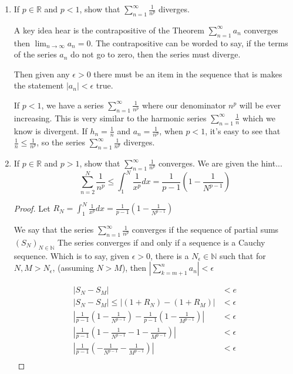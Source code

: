 \documentclass{tufte-book}
\theoremstyle{mytheoremstyle}
\theoremstyle{mylemstyle}
\theoremstyle{mydefstyle}
\begin{document}
\begin{enumerate}

\item If $p \in \mathbb{R}$ and $p < 1$, show that $\sum_{n=1}^{\infty}\frac{1}{n^p}$ diverges.

A key idea hear is the contrapositive of the Theorem $\sum_{n=1}^{\infty}a_n$ converges then $\lim_{n \rightarrow \infty}a_n = 0$. The contrapositive can be worded to say, if the terms of the series $a_n$ do not go to zero, then the series must diverge.

Then given any $\epsilon > 0$ there must be an item in the sequence that is makes the statement $|a_n| < \epsilon$ true.  

If  $p < 1$, we have a series $\sum_{n=1}^{\infty}\frac{1}{n^p}$ where our denominator $n^p$ will be ever increasing.  This is very similar to the harmonic series $\sum_{n=1}^{\infty}\frac{1}{n}$ which we know is divergent.  If $h_n = \frac{1}{n}$ and $a_n = \frac{1}{n^p}$, when $p < 1$, it's easy to see that
$\frac{1}{n} \leq \frac{1}{n^p}$, so the series $\sum_{n=1}^{\infty}\frac{1}{n^p}$ diverges.


\item If $p \in \mathbb{R}$ and $p > 1$, show that $\sum_{n=1}^{\infty}\frac{1}{n^p}$ converges.
We are given the hint...
\[ \sum_{n=2}^{N}\frac{1}{n^p} \leq \int_{1}^{N} \frac{1}{x^p}dx = \frac{1}{p-1}(1-\frac{1}{N^{p-1}})\]


\begin{proof}


Let $R_N = \int_{1}^{N} \frac{1}{x^p}dx = \frac{1}{p-1}(1-\frac{1}{N^{p-1}})$

We  say that the series $\sum_{n=1}^{\infty}\frac{1}{n^p}$ converges if the sequence of partial sums $(S_N)_{N \in \mathbb{N}}$  The series converges if and only if a sequence is a Cauchy sequence.  Which is to say, given $\epsilon > 0$, there is a $N_\epsilon\in \mathbb{N}$ such that for $N,M > N_\epsilon$, (assuming $N>M$), then $|\sum_{k=m+1}^{n}a_n| < \epsilon$

\begin{align*}
|S_N - S_M| &< e \\
|S_N - S_M| \leq |(1 + R_N) - (1 + R_M)| &< \epsilon \\
|\frac{1}{p-1}(1-\frac{1}{N^{p-1}}) - \frac{1}{p-1}(1-\frac{1}{M^{p-1}})| &< \epsilon \\
|\frac{1}{p-1}(1-\frac{1}{N^{p-1}} - 1-\frac{1}{M^{p-1}})| &< \epsilon\\
|\frac{1}{p-1}(-\frac{1}{N^{p-1}} - \frac{1}{M^{p-1}})| &< \epsilon\\
\end{align*}

\end{proof}
\end{enumerate}
\end{document}
